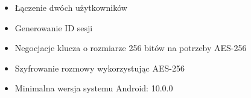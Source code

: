 \begin{itemize}
\item Łączenie dwóch użytkowników
\item Generowanie ID sesji
\item Negocjacje klucza o rozmiarze 256 bitów na potrzeby AES-256
\item Szyfrowanie rozmowy wykorzystując AES-256
\item Minimalna wersja systemu Android: 10.0.0
\end{itemize}
